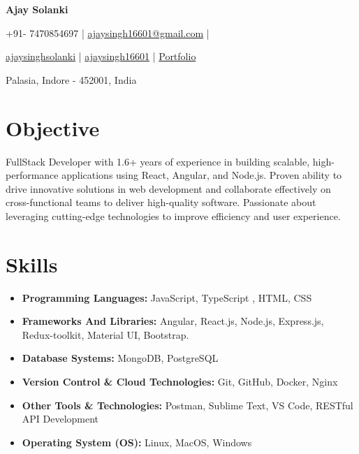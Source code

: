 \documentclass[a4paper,11pt]{article}
\newcommand{\resumeItem}[2]{
  \item{
    \textbf{#1}{\hspace{0.5mm}#2 \vspace{-0.5mm}}
  }
}
\newcommand{\resumeSubItem}[2]{\resumeItem{#1}{#2}\vspace{-4pt}}
\newcommand{\resumeHeadingSkillStart}{\begin{itemize}[leftmargin=*,itemsep=1.7mm, rightmargin=2ex]}
\newcommand{\resumeHeadingSkillEnd}{\end{itemize}\vspace{-2mm}}
\newcommand{\socialicon}[1]{\raisebox{-0.05em}{\resizebox{!}{1em}{#1}}}
\newcommand{\headerfontiii}{\fontfamily{ppl}\selectfont} %
\begin{document}
\headerfontiii

\begin{center}
    {\Huge\textbf{Ajay Solanki}}
\end{center}
\vspace{-5mm}

\begin{center}
    \small{
    +91-
    7470854697 | \href{mailto:ajaysingh16601@gmail.com}{ajaysingh16601@gmail.com} |
    }
\end{center}
\vspace{-5.5mm}

\begin{center}
    \small{
    \socialicon{\faLinkedin} \href{https://www.linkedin.com/in/ajaysinghsolanki/}{ajaysinghsolanki} | 
    \socialicon{\faGithub} \href{https://github.com/ajaysingh16601}{ajaysingh16601} | 
    \socialicon{\faIcon{globe}} \href{https://portfolio-threejs-ashy.vercel.app/}{Portfolio} 
    }
\end{center}
\vspace{-5.5mm}
\begin{center}
    \small{Palasia, Indore - 452001, India}
\end{center}

\vspace{-4mm}

\section{\textbf{Objective}}
\vspace{1mm}
\small{
  FullStack Developer with 1.6+ years of experience in building scalable, high-performance applications using React, Angular, and Node.js. Proven ability to drive innovative solutions in web development and collaborate effectively on cross-functional teams to deliver high-quality software. Passionate about leveraging cutting-edge technologies to improve efficiency and user experience. 
}
\vspace{-2mm}


\section{\textbf{Skills}}
\vspace{-0.2mm}
  \resumeHeadingSkillStart
    \resumeSubItem{Programming Languages:}
      { JavaScript, TypeScript , HTML, CSS}
    \resumeSubItem{Frameworks And Libraries:}
      { Angular, React.js, Node.js, Express.js, Redux-toolkit, Material UI, Bootstrap.}
    \resumeSubItem{Database Systems:}
      { MongoDB, PostgreSQL}
    \resumeSubItem{Version Control \& Cloud Technologies:}
      { Git, GitHub, Docker, Nginx}
    \resumeSubItem{Other Tools \& Technologies:}
      { Postman, Sublime Text, VS Code, RESTful API Development }
    \resumeSubItem{Operating System (OS):}
      { Linux, MacOS, Windows}
  \resumeHeadingSkillEnd
\end{document}
